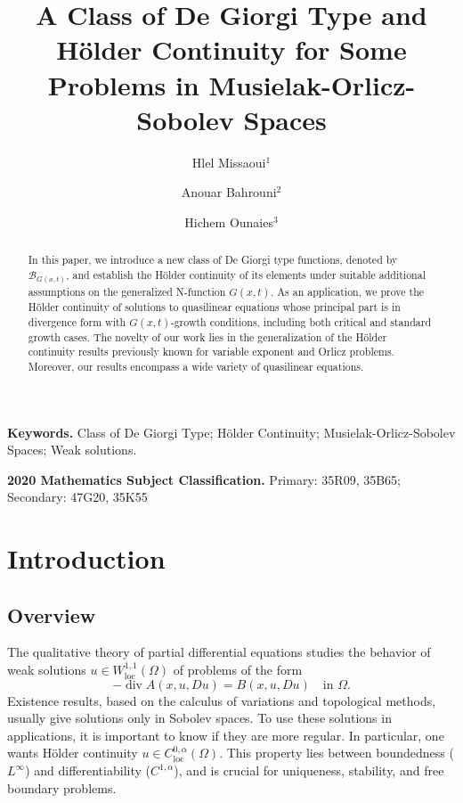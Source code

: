 \documentclass[10pt,reqno]{amsart}
\title{A Class of De Giorgi Type and H\"older Continuity for Some Problems in Musielak-Orlicz-Sobolev Spaces}
\author{Hlel Missaoui$^{1}$}
\author{Anouar Bahrouni$^{2}$}
\author{Hichem Ounaies$^{3}$}
\date{}
\newcommand *\w{^\wedge}
\theoremstyle{definition}
\numberwithin{equation}{section}
\begin{document}
\begin{abstract}
In this paper, we introduce a new class of De Giorgi type functions, denoted by \(\mathcal{B}_{G(x,t)}\), and establish the H\"older continuity of its elements under suitable additional assumptions on the generalized \textnormal{N}-function \(G(x,t)\). As an application, we prove the H\"older continuity of solutions to quasilinear equations whose principal part is in divergence form with \(G(x,t)\)-growth conditions, including both critical and standard growth cases. The novelty of our work lies in the generalization of the H\"older continuity results previously known for variable exponent \cite[X, Fan and D. Zhao]{Fan1999} and Orlicz \cite[G. M. Lieberman]{Li1991} problems. Moreover, our results encompass a wide variety of quasilinear equations.

\end{abstract}
\maketitle
\noindent \textbf{Keywor{\rm d}s.} Class of De Giorgi Type; H\"older Continuity; Musielak-Orlicz-Sobolev Spaces; Weak solutions.

\noindent\textbf{\textup{2020} Mathematics Subject Classification.} {Primary: 
35R09, %
35B65; %
Secondary: 
47G20, %
35K55%
}

\smallskip
	
\tableofcontents


\section{Introduction}
\label{sec:intro}
\subsection{Overview}
The qualitative theory of partial differential equations studies the behavior of weak solutions
$u \in W^{1,1}_{\mathrm{loc}}(\Omega)$ of problems of the form
\begin{equation}\label{main_eq}
-\operatorname{div} A(x,u,D u) = B(x,u,D u) \quad \text{in } \Omega.
\end{equation}
Existence results, based on the calculus of variations and topological methods, usually give solutions only in Sobolev spaces. 
To use these solutions in applications, it is important to know if they are more regular. 
In particular, one wants Hölder continuity $u \in C^{0,\alpha}_{\mathrm{loc}}(\Omega)$. 
This property lies between boundedness ($L^\infty$) and differentiability ($C^{1,\alpha}$), and is crucial for uniqueness, stability, and free boundary problems.\\
\end{document}
